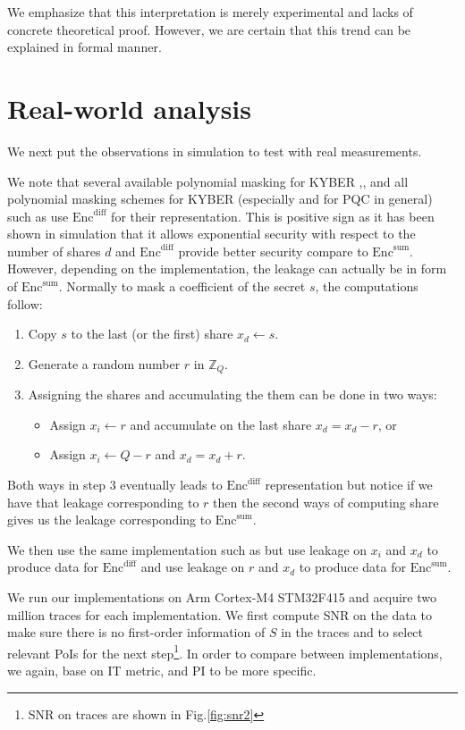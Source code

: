 \documentclass{llncs}
\begin{document}
We emphasize that this interpretation is merely experimental and lacks of concrete theoretical proof. However, we are certain that this trend can be explained in formal manner.
\section{Real-world analysis}\label{sec:onm}
We next put the observations in simulation to test with real measurements.

We note that several available polynomial masking for KYBER \cite{Kmaskimp0},\cite{Kmaskimp1}, \cite{Kmaskimp2} and all polynomial masking schemes for KYBER (especially and for PQC in general) such as \cite{Kmask1}  use $\text{Enc}^{\text{diff}}$ for their representation. This is positive sign as it has been shown in simulation that it allows exponential security with respect to the number of shares $d$ and $\text{Enc}^{\text{diff}}$ provide better security compare to $\text{Enc}^{\text{sum}}$. However, depending on the implementation, the leakage can actually be in form of $\text{Enc}^{\text{sum}}$. Normally to mask a coefficient of the secret $s$, the computations follow:
\begin{enumerate}
	\item Copy $s$ to the last (or the first) share $x_d \leftarrow s$.
	\item Generate a random number $r$ in $\mathbb{Z}_Q$.
	\item Assigning the shares and accumulating the them can be done in two ways:
	\begin{itemize}
		\item Assign $x_i \leftarrow r$ and accumulate on the last share $x_d = x_d - r$, or
		\item Assign $x_i \leftarrow Q - r$ and $x_d = x_d + r$.
	\end{itemize}
\end{enumerate}
Both ways in step 3 eventually leads to $\text{Enc}^{\text{diff}}$ representation but notice if we have that leakage corresponding to $r$ then the second ways of computing share gives us the leakage corresponding to $\text{Enc}^{\text{sum}}$.

We then use the same implementation such as \cite{Kmaskimp0} but use leakage on $x_i$ and $x_d$ to produce data for $\text{Enc}^{\text{diff}}$ and use leakage on $r$ and $x_d$ to produce data for $\text{Enc}^{\text{sum}}$.

We run our implementations on Arm Cortex-M4 STM32F415 and acquire two million traces for each implementation. We first compute SNR on the data to make sure there is no first-order information of $S$ in the traces and to select relevant PoIs for the next step\footnote{SNR on traces are shown in Fig.\ref{fig:snr2}}. In order to compare between implementations, we again, base on IT metric, and PI to be more specific.
\end{document}
